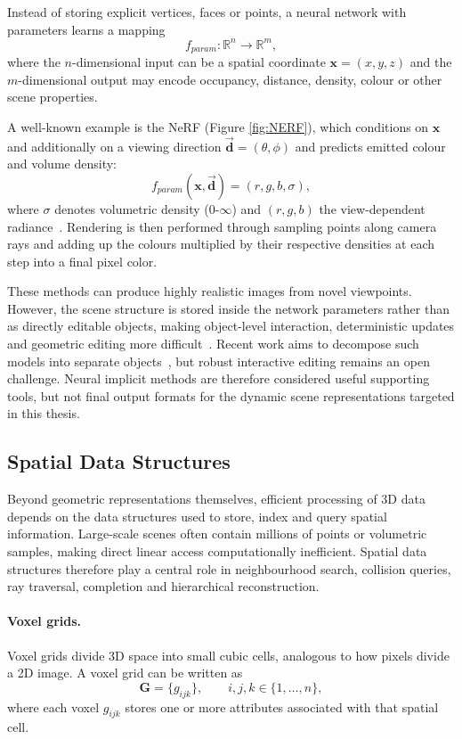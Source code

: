 Instead of storing explicit vertices, faces or points, a neural network with parameters learns a mapping
\[
f_{param} : \mathbb{R}^{n} \rightarrow \mathbb{R}^{m},
\]
where the $n$-dimensional input can be a spatial coordinate $\mathbf{x}=(x,y,z)$ and the $m$-dimensional output may encode occupancy, distance, density, colour or other scene properties.

A well-known example is the \gls{NeRF} (Figure \ref{fig:NERF}), which conditions on $\mathbf{x}$ and additionally on a viewing direction $\vec{\mathbf{d}} = (\theta, \phi)$ and predicts emitted colour and volume density:
\[
f_{param}(\mathbf{x}, \vec{\mathbf{d}}) = (r, g, b, \sigma),
\]
where $\sigma$ denotes volumetric density (0-$\infty$) and $(r,g,b)$ the view-dependent radiance~\cite{mildenhall_nerf_2020}. Rendering is then performed through sampling points along camera rays and adding up the colours multiplied by their respective densities at each step into a final pixel color.

These methods can produce highly realistic images from novel viewpoints. However, the scene structure is stored inside the network parameters rather than as directly editable objects, making object-level interaction, deterministic updates and geometric editing more difficult~\cite{weber_nerfiller_2023}. Recent work aims to decompose such models into separate objects~\cite{ardelean_gen3dsr_2025}, but robust interactive editing remains an open challenge. Neural implicit methods are therefore considered useful supporting tools, but not final output formats for the dynamic scene representations targeted in this thesis.

\subsection{Spatial Data Structures}
\label{sec:bg_datastructures}

Beyond geometric representations themselves, efficient processing of 3D data depends on the data structures used to store, index and query spatial information. Large-scale scenes often contain millions of points or volumetric samples, making direct linear access computationally inefficient. Spatial data structures therefore play a central role in neighbourhood search, collision queries, ray traversal, completion and hierarchical reconstruction.

\paragraph{Voxel grids.}
Voxel grids divide 3D space into small cubic cells, analogous to how pixels divide a 2D image. A voxel grid can be written as
\[
\mathbf{G} = \{g_{ijk}\}, \qquad i,j,k \in \{1,\dots,n\},
\]
where each voxel $g_{ijk}$ stores one or more attributes associated with that spatial cell.

